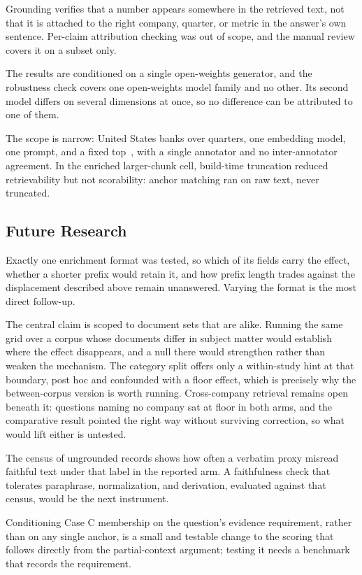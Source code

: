 Grounding verifies that a number appears somewhere in the retrieved text, not
that it is attached to the right company, quarter, or metric in the answer's own
sentence. Per-claim attribution checking was out of scope, and the manual
review covers it on a subset only.

The results are conditioned on a single open-weights generator, and the
robustness check covers one open-weights model family and no other. Its second
model differs on several dimensions at once, so no difference can be attributed
to one of them.

The scope is narrow: \thesisNumCompanies{} United States banks over
\thesisNumQuarters{} quarters, one embedding model, one prompt, and a fixed
top~\thesisTopK{}, with a single annotator and no inter-annotator agreement. In
the enriched larger-chunk cell, build-time truncation reduced retrievability but
not scorability: anchor matching ran on raw text, never truncated.

\subsection{Future Research}

Exactly one enrichment format was tested, so which of its fields carry the
effect, whether a shorter prefix would retain it, and how prefix length trades
against the displacement described above remain unanswered. Varying the format
is the most direct follow-up.

The central claim is scoped to document sets that are alike. Running the same
grid over a corpus whose documents differ in subject matter would establish
where the effect disappears, and a null there would strengthen rather than
weaken the mechanism. The category split offers only a within-study hint at
that boundary, post hoc and confounded with a floor effect, which is precisely
why the between-corpus version is worth running. Cross-company retrieval remains
open beneath it: questions naming no company sat at floor in both arms, and the
comparative result pointed the right way without surviving correction, so what
would lift either is untested.

The census of ungrounded records shows how often a verbatim proxy misread
faithful text under that label in the reported arm. A faithfulness check that
tolerates paraphrase, normalization, and derivation, evaluated against that
census, would be the next instrument.

Conditioning Case C membership on the question's evidence requirement, rather
than on any single anchor, is a small and testable change to the scoring that
follows directly from the partial-context argument; testing it needs a
benchmark that records the requirement.

